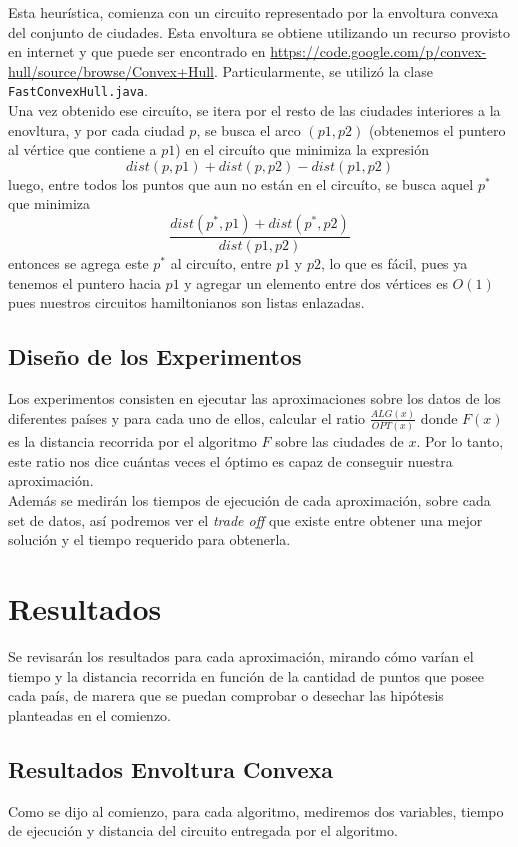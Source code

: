 \documentclass[12pt,letterpaper, margin = 3cm]{article}
\begin{document}
Esta heurística, comienza con un circuito representado por la envoltura convexa del conjunto de ciudades. Esta envoltura se obtiene utilizando un recurso provisto en internet y que puede ser encontrado en \url{https://code.google.com/p/convex-hull/source/browse/Convex+Hull}. Particularmente, se utilizó la clase \verb+FastConvexHull.java+.\\
Una vez obtenido ese circuíto, se itera por el resto de las ciudades interiores a la enovltura, y por cada ciudad $p$, se busca el arco $(p1,p2)$ (obtenemos el puntero al vértice que contiene a $p1$) en el circuíto que minimiza la expresión \[ dist(p,p1)+dist(p,p2)-dist(p1,p2) \] luego, entre todos los puntos que aun no están en el circuíto, se busca aquel $p^*$ que minimiza \[ \frac{dist(p^*,p1)+dist(p^*,p2)}{dist(p1,p2)} \] entonces se agrega este $p^*$ al circuíto, entre $p1$ y $p2$, lo que es fácil, pues ya tenemos el puntero hacia $p1$ y agregar un elemento entre dos vértices es $O(1)$ pues nuestros circuitos hamiltonianos son listas enlazadas.\\


\subsection{Diseño de los Experimentos}
Los experimentos consisten en ejecutar las aproximaciones sobre los datos de los diferentes países y para cada uno de ellos, calcular el ratio $\frac{ALG(x)}{OPT(x)}$ donde $F(x)$ es la distancia recorrida por el algoritmo $F$ sobre las ciudades de $x$. Por lo tanto, este ratio nos dice cuántas veces el óptimo es capaz de conseguir nuestra aproximación.\\
Además se medirán los tiempos de ejecución de cada aproximación, sobre cada set de datos, así podremos ver el \textit{trade off} que existe entre obtener una mejor solución y el tiempo requerido para obtenerla.

\newpage
\section{Resultados}
Se revisarán los resultados para cada aproximación, mirando cómo varían el tiempo y la distancia recorrida  en función de la cantidad de puntos que posee cada país, de marera que se puedan comprobar o desechar las hipótesis planteadas en el comienzo.

\subsection{Resultados Envoltura Convexa}
Como se dijo al comienzo, para cada algoritmo, mediremos dos variables, tiempo de ejecución y distancia del circuito entregada por el algoritmo.
\end{document}
